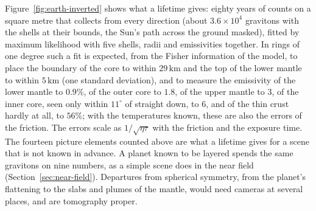 Figure~\ref{fig:earth-inverted} shows what a lifetime gives: eighty years of
counts on a square metre that collects from every direction (about
$3.6\times10^4$ gravitons with the shells at their bounds, the Sun's path
across the ground masked), fitted by maximum likelihood with five shells, radii
and emissivities together. In rings of one degree such a fit is
expected, from the Fisher information of the model, to place the boundary of
the core to within $29\,\mathrm{km}$ and the top of the lower mantle to within
$5\,\mathrm{km}$ (one standard deviation), and to measure the
emissivity of the lower mantle to $0.9\%$, of the outer core to $1.8$,
of the upper mantle to $3$, of the inner core, seen only within $11^\circ$ of straight
down, to $6$, and of the thin crust hardly at all, to $56\%$; with the
temperatures known, these are also the errors of the friction. The errors scale
as $1/\sqrt{\eta\tau}$ with the friction and the exposure time. The fourteen
picture elements counted above are what a lifetime gives for a scene that is not known in advance. A planet known to be layered
spends the same gravitons on nine numbers, as a simple scene does in the near
field (Section~\ref{sec:near-field}). Departures from spherical symmetry, from
the planet's flattening to the slabs and plumes of the mantle, would need
cameras at several places, and are tomography proper.

